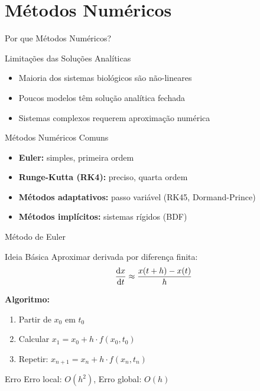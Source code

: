 \section{Métodos Numéricos}

\begin{frame}{Por que Métodos Numéricos?}
\begin{alertblock}{Limitações das Soluções Analíticas}
\begin{itemize}
    \item Maioria dos sistemas biológicos são não-lineares
    \item Poucos modelos têm solução analítica fechada
    \item Sistemas complexos requerem aproximação numérica
\end{itemize}
\end{alertblock}

\vspace{0.3cm}

\begin{block}{Métodos Numéricos Comuns}
\begin{itemize}
    \item \textbf{Euler:} simples, primeira ordem
    \item \textbf{Runge-Kutta (RK4):} preciso, quarta ordem
    \item \textbf{Métodos adaptativos:} passo variável (RK45, Dormand-Prince)
    \item \textbf{Métodos implícitos:} sistemas rígidos (BDF)
\end{itemize}
\end{block}
\end{frame}

\begin{frame}[allowframebreaks]{Método de Euler}
\begin{block}{Ideia Básica}
Aproximar derivada por diferença finita:
\begin{equation*}
\frac{\mathrm{d} x}{\mathrm{d} t} \approx \frac{x(t+h) - x(t)}{h}
\end{equation*}
\end{block}


\textbf{Algoritmo:}
\begin{enumerate}
    \item Partir de $x_0$ em $t_0$
    \item Calcular $x_1 = x_0 + h \cdot f(x_0, t_0)$
    \item Repetir: $x_{n+1} = x_n + h \cdot f(x_n, t_n)$
\end{enumerate}

\begin{exampleblock}{Erro}
Erro local: $O(h^2)$, Erro global: $O(h)$
\end{exampleblock}
\end{frame}

